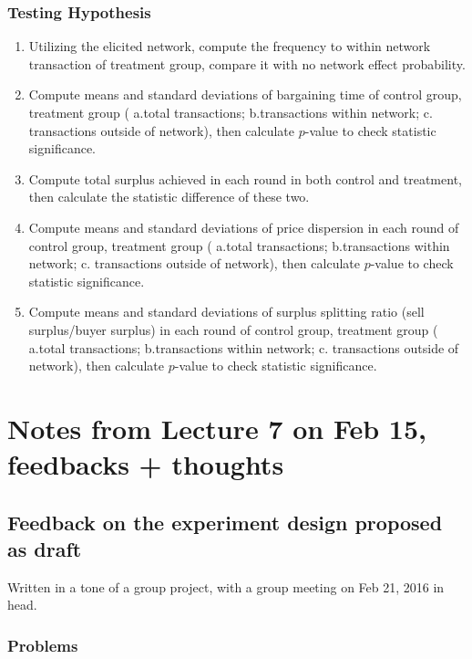 \documentclass{article}
\begin{document}
\subsubsection{Testing Hypothesis}
\begin{enumerate}[{Hypothesis} 1]
    \item  Utilizing the elicited network, compute the frequency to within network
        transaction of treatment group, compare it with no network effect
        probability.
    \item  Compute means and standard deviations of bargaining time of control
        group, treatment group ( a.total transactions; b.transactions within
        network; c. transactions outside of network), then calculate $p$-value to check
        statistic significance.
    \item  Compute total surplus achieved in each round in both control and
        treatment, then calculate the statistic difference of these two.
    \item Compute means and standard deviations of price dispersion in each round of
        control group, treatment group ( a.total transactions; b.transactions within
        network; c. transactions outside of network), then calculate $p$-value to check
        statistic significance.
    \item Compute means and standard deviations of surplus splitting ratio (sell
            surplus/buyer surplus) in each round of control group, treatment group (
            a.total transactions; b.transactions within network; c. transactions outside of
        network), then calculate $p$-value to check statistic significance.
\end{enumerate}



\section{Notes from Lecture 7 on Feb 15, feedbacks + thoughts }

\subsection{Feedback on the experiment design proposed as draft}
Written in a tone of a group project, with a group meeting on Feb 21, 2016 in
head.

\subsubsection{Problems}
\end{document}
